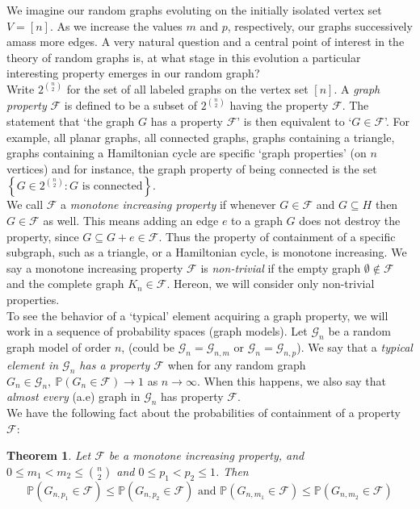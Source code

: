 \documentclass[12pt,oneside,reqno]{amsart}
\newtheorem{theorem}{Theorem}[section]
\theoremstyle{definition}
\numberwithin{equation}{theorem}
\newcommand{\PP}{{\mathbb P}}%
\newcommand{\cF}{{\mathcal F}}
\newcommand{\sG}{{\mathscr{G}}}
\begin{document}
We imagine our random graphs evoluting on the initially isolated vertex set $V = [n]$. As we increase the values $m$ and $p$, respectively, our graphs successively amass more edges. A very natural question and a central point of interest in the theory of random graphs is, at what stage in this evolution a particular interesting property emerges in our random graph? 
\newline 
\\
Write $2^{\binom{n}{2}}$ for the set of all labeled graphs on the vertex set $[n]$. A \emph{graph property} $\cF$ is defined to be a subset of $2^{\binom{n}{2}}$ having the property $\cF$. The statement that `the graph $G$ has a property $\cF$' is then equivalent to `$G \in \cF$'. For example, all planar graphs, all connected graphs, graphs containing a triangle, graphs containing a Hamiltonian cycle are specific `graph properties' (on $n$ vertices) and for instance, the graph property of being connected is the set $\left\{G \in 2^{\binom{n}{2}}\colon G\textrm{ is connected}\right\}.$
\newline
\\
We call $\cF$ a \emph{monotone increasing property} if whenever $G \in \cF$ and $G \subseteq H$ then $G \in \cF$ as well. This means adding an edge $e$ to a graph $G$ does not destroy the property, since $G \subseteq G + e \in \cF$. Thus the property of containment of a specific subgraph, such as a triangle, or a Hamiltonian cycle, is monotone increasing. We say a monotone increasing property $\cF$ is \emph{non-trivial} if the empty graph $\emptyset \notin \cF$ and the complete graph $K_n \in \cF$. Hereon, we will consider only non-trivial properties.
\newline 
\\
To see the behavior of a `typical' element acquiring a graph property, we will work in a sequence of probability spaces (graph models). Let $\sG_n$ be a random graph model of order $n$, (could be $\sG_n = \sG_{n,m}$ or $\sG_n = \sG_{n,p}$). We say that a \emph{typical element in $\sG_n$ has a property $\cF$} when for any random graph $G_n \in \sG_n, \ \PP(G_n \in \cF) \rightarrow 1$ as $n \rightarrow \infty$. When this happens, we also say that \emph{almost every} (a.e) graph in $\sG_n$ has property $\cF$. 
\newline 
\\
We have the following fact about the probabilities of containment of a property $\cF$:
\begin{theorem}\label{couplingtheorem}
Let $\cF$ be a monotone increasing property, and $0 \leq m_1 < m_2 \leq \binom{n}{2}$ and $0 \leq p_1<p_2 \leq 1$. Then 
$$\mathbb{P}\left({G}_{n, p_1} \in \cF \right) \leq \mathbb{P}\left({G}_{n, p_2} \in \cF \right) \textrm{ and } \mathbb{P} \left({G}_{n, m_1} \in \cF \right) \leq \mathbb{P}\left({G}_{n, m_2} \in \cF \right)$$
\end{theorem}
\end{document}
